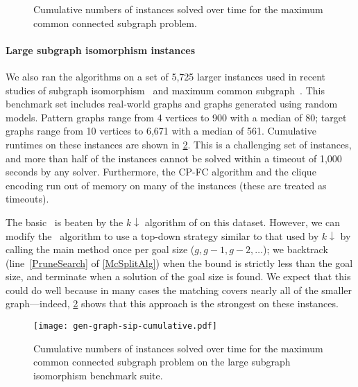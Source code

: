 \documentclass[letterpaper]{article}
\newcommand{\citet}[1]{\citeauthor{#1} \shortcite{#1}}
\newcommand{\citep}[1]{\cite{#1}}
\newcommand{\McSplit}{\textproc{McSplit}}
\newcommand{\lineref}[1]{line~\ref{#1}}
\begin{document}
\begin{figure}[t]
    \centering\subfiguretopcaptrue

    \caption{Cumulative numbers of instances solved over time for the maximum
    common connected subgraph problem.} \label{figure:mcs-connected-cumulative}
\end{figure}

\paragraph{Large subgraph isomorphism instances} We also ran the algorithms on
a set of 5,725 larger instances used in recent studies of subgraph
isomorphism~\citep{DBLP:conf/lion/KotthoffMS16} and maximum common
subgraph~\citep{UpcomingAAAIPaper}.  This benchmark set includes real-world
graphs and graphs generated using random models.  Pattern graphs range from 4
vertices to 900 with a median of 80; target graphs range from 10 vertices to
6,671 with a median of 561. Cumulative runtimes on these instances are shown in
\cref{figure:sip-cumulative}.  This is a challenging set of instances, and more
than half of the instances cannot be solved within a timeout of 1,000 seconds by
any solver. Furthermore, the CP-FC algorithm and the clique encoding run out of
memory on many of the instances (these are treated as timeouts).

The basic \McSplit\ is beaten by the $k\downarrow$ algorithm of
\citet{UpcomingAAAIPaper} on this dataset. However, we can modify the \McSplit\
algorithm to use a top-down strategy similar to that used by $k\downarrow$  by
calling the main \FuncSty{McSplit} method once per goal size ($g, g-1, g-2,
\dots$); we backtrack (\lineref{PruneSearch} of \cref{McSplitAlg}) when the
bound is strictly less than the goal size, and terminate when a solution of the
goal size is found. We expect that this could do well because in many cases the
matching covers nearly all of the smaller graph---indeed,
\cref{figure:sip-cumulative} shows that this approach is the strongest on these
instances.

\begin{figure}[t]
    \centering
    \texttt{[image: gen-graph-sip-cumulative.pdf]}
    \caption{Cumulative numbers of instances solved over time for the maximum
    common connected subgraph problem on the large subgraph isomorphism benchmark
    suite.} \label{figure:sip-cumulative}
\end{figure}
\end{document}
